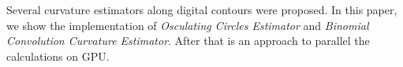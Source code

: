 Several curvature estimators along digital contours were proposed. In this paper, we show the implementation of \textit{Osculating Circles Estimator} and \textit{Binomial Convolution Curvature Estimator}. After that is an approach to parallel the calculations on GPU.